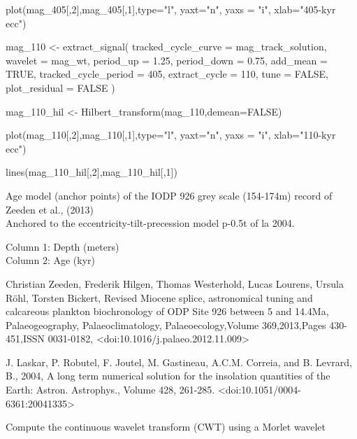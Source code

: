 \documentclass[a4paper]{book}
\begin{document}
\begin{Examples}
\begin{ExampleCode}
plot(mag_405[,2],mag_405[,1],type="l",
    yaxt="n", yaxs = "i",
    xlab="405-kyr ecc")


mag_110 <- extract_signal(
 tracked_cycle_curve = mag_track_solution,
 wavelet = mag_wt,
 period_up = 1.25,
 period_down = 0.75,
 add_mean = TRUE,
 tracked_cycle_period = 405,
 extract_cycle = 110,
 tune = FALSE,
 plot_residual = FALSE
)

mag_110_hil <- Hilbert_transform(mag_110,demean=FALSE)

plot(mag_110[,2],mag_110[,1],type="l",
    yaxt="n", yaxs = "i",
    xlab="110-kyr ecc")

lines(mag_110_hil[,2],mag_110_hil[,1])

\end{ExampleCode}
\end{Examples}
%
\begin{Description}
Age model (anchor points) of the IODP 926 grey scale (154-174m) record of Zeeden et al., (2013) \\{}
Anchored to the eccentricity-tilt-precession model p-0.5t of la 2004.
\end{Description}
%
\begin{Details}
Column 1: Depth (meters)\\{}
Column 2: Age (kyr)\\{}
\end{Details}
%
\begin{References}
Christian Zeeden, Frederik Hilgen, Thomas Westerhold, Lucas Lourens, Ursula Röhl, Torsten Bickert,
Revised Miocene splice, astronomical tuning and calcareous plankton biochronology of ODP Site 926 between 5 and 14.4Ma,
Palaeogeography, Palaeoclimatology, Palaeoecology,Volume 369,2013,Pages 430-451,ISSN 0031-0182,
<doi:10.1016/j.palaeo.2012.11.009>


J. Laskar, P. Robutel, F. Joutel, M. Gastineau, A.C.M. Correia, and B. Levrard, B., 2004,
A long term numerical solution for the insolation quantities of the Earth: Astron. Astrophys.,
Volume 428, 261-285. <doi:10.1051/0004-6361:20041335>
\end{References}
%
\begin{Description}
Compute the continuous wavelet transform (CWT) using a Morlet wavelet
\end{Description}
\end{document}
